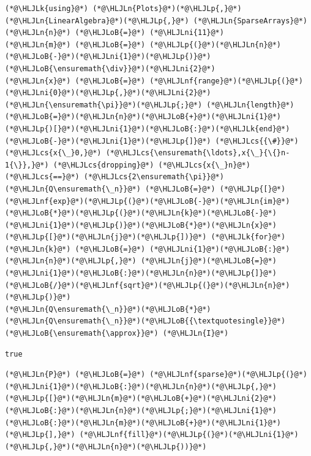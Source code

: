 \documentclass[12pt,landscape]{article}
\newcommand{\HLJLk}[1]{\textcolor[RGB]{148,91,176}{\textbf{#1}}}
\newcommand{\HLJLn}[1]{#1}
\newcommand{\HLJLnf}[1]{\textcolor[RGB]{66,102,213}{#1}}
\newcommand{\HLJLni}[1]{\textcolor[RGB]{59,151,46}{#1}}
\newcommand{\HLJLoB}[1]{\textcolor[RGB]{102,102,102}{\textbf{#1}}}
\newcommand{\HLJLp}[1]{#1}
\newcommand{\HLJLcs}[1]{\textcolor[RGB]{153,153,119}{\textit{#1}}}
\begin{document}
{\begin{lstlisting}
(*@\HLJLk{using}@*) (*@\HLJLn{Plots}@*)(*@\HLJLp{,}@*) (*@\HLJLn{LinearAlgebra}@*)(*@\HLJLp{,}@*) (*@\HLJLn{SparseArrays}@*)
(*@\HLJLn{n}@*) (*@\HLJLoB{=}@*) (*@\HLJLni{11}@*)
(*@\HLJLn{m}@*) (*@\HLJLoB{=}@*) (*@\HLJLp{(}@*)(*@\HLJLn{n}@*)(*@\HLJLoB{-}@*)(*@\HLJLni{1}@*)(*@\HLJLp{)}@*)(*@\HLJLoB{\ensuremath{\div}}@*)(*@\HLJLni{2}@*)
(*@\HLJLn{x}@*) (*@\HLJLoB{=}@*) (*@\HLJLnf{range}@*)(*@\HLJLp{(}@*)(*@\HLJLni{0}@*)(*@\HLJLp{,}@*)(*@\HLJLni{2}@*)(*@\HLJLn{\ensuremath{\pi}}@*)(*@\HLJLp{;}@*) (*@\HLJLn{length}@*)(*@\HLJLoB{=}@*)(*@\HLJLn{n}@*)(*@\HLJLoB{+}@*)(*@\HLJLni{1}@*)(*@\HLJLp{)[}@*)(*@\HLJLni{1}@*)(*@\HLJLoB{:}@*)(*@\HLJLk{end}@*)(*@\HLJLoB{-}@*)(*@\HLJLni{1}@*)(*@\HLJLp{]}@*) (*@\HLJLcs{{\#}}@*) (*@\HLJLcs{x{\_}0,}@*) (*@\HLJLcs{\ensuremath{\ldots},x{\_}{\{}n-1{\}},}@*) (*@\HLJLcs{dropping}@*) (*@\HLJLcs{x{\_}n}@*) (*@\HLJLcs{==}@*) (*@\HLJLcs{2\ensuremath{\pi}}@*)
(*@\HLJLn{Q\ensuremath{\_n}}@*) (*@\HLJLoB{=}@*) (*@\HLJLp{[}@*)(*@\HLJLnf{exp}@*)(*@\HLJLp{(}@*)(*@\HLJLoB{-}@*)(*@\HLJLn{im}@*)(*@\HLJLoB{*}@*)(*@\HLJLp{(}@*)(*@\HLJLn{k}@*)(*@\HLJLoB{-}@*)(*@\HLJLni{1}@*)(*@\HLJLp{)}@*)(*@\HLJLoB{*}@*)(*@\HLJLn{x}@*)(*@\HLJLp{[}@*)(*@\HLJLn{j}@*)(*@\HLJLp{])}@*) (*@\HLJLk{for}@*) (*@\HLJLn{k}@*) (*@\HLJLoB{=}@*) (*@\HLJLni{1}@*)(*@\HLJLoB{:}@*)(*@\HLJLn{n}@*)(*@\HLJLp{,}@*) (*@\HLJLn{j}@*)(*@\HLJLoB{=}@*)(*@\HLJLni{1}@*)(*@\HLJLoB{:}@*)(*@\HLJLn{n}@*)(*@\HLJLp{]}@*)(*@\HLJLoB{/}@*)(*@\HLJLnf{sqrt}@*)(*@\HLJLp{(}@*)(*@\HLJLn{n}@*)(*@\HLJLp{)}@*)
(*@\HLJLn{Q\ensuremath{\_n}}@*)(*@\HLJLoB{*}@*)(*@\HLJLn{Q\ensuremath{\_n}}@*)(*@\HLJLoB{{\textquotesingle}}@*) (*@\HLJLoB{\ensuremath{\approx}}@*) (*@\HLJLn{I}@*)
\end{lstlisting}

\begin{lstlisting}
true
\end{lstlisting}


\begin{lstlisting}
(*@\HLJLn{P}@*) (*@\HLJLoB{=}@*) (*@\HLJLnf{sparse}@*)(*@\HLJLp{(}@*)(*@\HLJLni{1}@*)(*@\HLJLoB{:}@*)(*@\HLJLn{n}@*)(*@\HLJLp{,}@*) (*@\HLJLp{[}@*)(*@\HLJLn{m}@*)(*@\HLJLoB{+}@*)(*@\HLJLni{2}@*)(*@\HLJLoB{:}@*)(*@\HLJLn{n}@*)(*@\HLJLp{;}@*)(*@\HLJLni{1}@*)(*@\HLJLoB{:}@*)(*@\HLJLn{m}@*)(*@\HLJLoB{+}@*)(*@\HLJLni{1}@*)(*@\HLJLp{],}@*) (*@\HLJLnf{fill}@*)(*@\HLJLp{(}@*)(*@\HLJLni{1}@*)(*@\HLJLp{,}@*)(*@\HLJLn{n}@*)(*@\HLJLp{))}@*)
\end{lstlisting}

}
\end{document}
